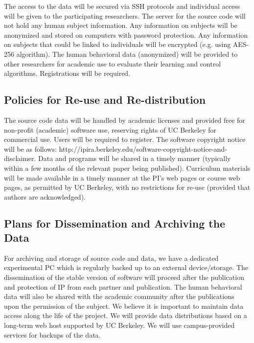 The access to the data will be secured via SSH protocols and individual access will be given to the participating researchers. The server for the source code will not hold any human subject information. Any information on subjects will be anonymized and stored on computers with password protection. Any information on subjects that could be linked to individuals will be encrypted (e.g. using AES-256 algorithm). The human behavioral data (anonymized) will be provided to other researchers for academic use to evaluate their learning and control algorithms. Registrations will be required.


\subsection{Policies for Re-use and Re-distribution}
The source code data will be handled by academic licenses and provided free for non-profit (academic) software use, reserving rights of UC Berkeley for commercial use. Users will be required to register. The software copyright notice will be as follows: http://ipira.berkeley.edu/software-copyright-notice-and-disclaimer. Data and programs will be shared in a timely manner (typically within a few months of the relevant paper being published). Curriculum materials will be made available in a timely manner at the PI's web pages or course web pages, as permitted by UC Berkeley, with no restrictions for re-use (provided that authors are acknowledged).


\subsection{Plans for Dissemination and Archiving the Data}
For archiving and storage of source code and data, we have a dedicated experimental PC which is regularly backed up to an external device/storage.
The dissemination of the stable version of software will proceed after the publication and protection of IP from each partner and publication. The human behavioral data will also be shared with the academic community after the publications upon the permission of the subject.
We believe it is important to maintain data access along the life of the project. We will provide data distributions based on a long-term web host supported by UC Berkeley. We will use campus-provided services for backups of the data.